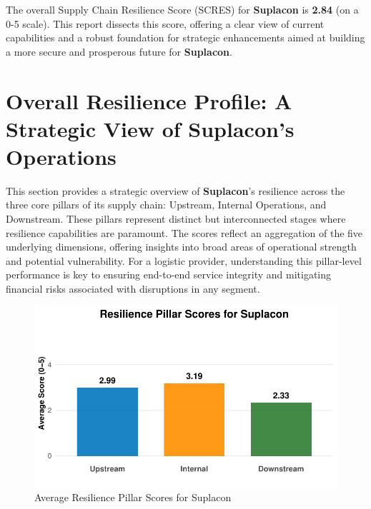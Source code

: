 \documentclass[
  oneside,
  open=any,
  fontsize=11pt]{scrbook}
\begin{document}
The overall Supply Chain Resilience Score (SCRES) for \textbf{Suplacon}
is \textbf{2.84} (on a 0-5 scale). This report dissects this score,
offering a clear view of current capabilities and a robust foundation
for strategic enhancements aimed at building a more secure and
prosperous future for \textbf{Suplacon}.

\chapter{Overall Resilience Profile: A Strategic View of Suplacon's
Operations}\label{overall-resilience-profile-a-strategic-view-of-suplacons-operations}

This section provides a strategic overview of \textbf{Suplacon}'s
resilience across the three core pillars of its supply chain: Upstream,
Internal Operations, and Downstream. These pillars represent distinct
but interconnected stages where resilience capabilities are paramount.
The scores reflect an aggregation of the five underlying dimensions,
offering insights into broad areas of operational strength and potential
vulnerability. For a logistic provider, understanding this pillar-level
performance is key to ensuring end-to-end service integrity and
mitigating financial risks associated with disruptions in any segment.

\begin{figure}[H]

{\centering \includegraphics[width=1\linewidth,height=\textheight,keepaspectratio]{example_3_files/figure-pdf/pillar-scores-chart-1.pdf}

}

\caption{Average Resilience Pillar Scores for Suplacon}

\end{figure}%
\end{document}
